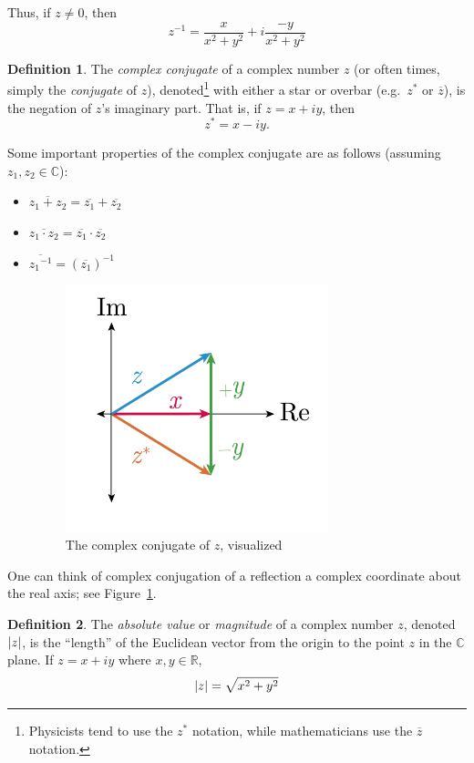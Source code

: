 \documentclass[10pt]{scrartcl}
\numberwithin{equation}{subsection}
\theoremstyle{definition}
\newtheorem{definition}{Definition}[section]
\theoremstyle{remark}
\newenvironment{definitionSR}
	{
		\begin{siderules}
			\begin{definition}
			}
			{
			\end{definition}
		\end{siderules}
	}
\newcommand{\Reals}{\mathbb{R}}
\newcommand{\Complex}{\mathbb{C}}
\newcommand{\inv}[1]{
		{#1}^{-1}
	}
\newcommand*{\conjugate}[1]{\overline{#1}}
\newcommand*{\conj}[1]{{#1}^*}
\begin{document}
Thus, if $z \neq 0$, then
\[
	\inv{z} = \frac{x}{x^2+y^2} + i \frac{-y}{x^2+y^2}
\]
\begin{definitionSR}
	The \textit{complex conjugate} of a complex number $z$
	(or often times, simply the \textit{conjugate} of $z$),
	denoted\footnote{Physicists tend to use the $\conj{z}$ notation,
	while mathematicians use the $\conjugate{z}$ notation.}
	with either a star or overbar (e.g.\ $\conj{z}$ or $\conjugate{z}$),
	is the negation of $z$'s imaginary part. That is, if $z = x+iy$, then
	\[
		\conj{z} = x-iy.
	\]

\end{definitionSR}
Some important properties of the complex conjugate are as follows
(assuming $z_1, z_2 \in \Complex$):
\begin{itemize}
	\item $\conjugate{z_1+z_2} = \conjugate{z_1} + \conjugate{z_2}$
	\item $\conjugate{z_1 \cdot  z_2} = \conjugate{z_1} \cdot \conjugate{z_2}$
	\item $\conjugate{\inv{z_1}} = \inv{(\conjugate{z_1})}$

		\begin{figure}[h]
			\centering
			\caption{The complex conjugate of $z$, visualized}
			\label{fig:conjugate}
			\includegraphics[width=3in]{complex_number_diagram-03}
		\end{figure}
\end{itemize}
One can think of complex conjugation of a reflection a complex coordinate about the real axis;
see Figure~\ref{fig:conjugate}.

\begin{definitionSR}
	The \textit{absolute value} or \textit{magnitude} of a 
	complex number $z$, denoted $\abs{z}$, is the ``length'' of the Euclidean vector from the origin 
	to the point $z$ in the $\Complex$ plane. If $z=x+iy$ where $x,y \in \Reals$,
	\[
		\abs{z} = \sqrt{x^2 + y^2}
	\]
\end{definitionSR}
\end{document}
